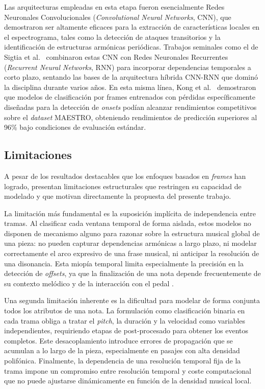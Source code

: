 Las arquitecturas empleadas en esta etapa fueron esencialmente Redes Neuronales
Convolucionales (\textit{Convolutional Neural Networks}, CNN), que demostraron ser
altamente eficaces para la extracción de características locales en el espectrograma, tales como la detección de ataques transitorios y la identificación de estructuras armónicas periódicas. Trabajos seminales como el de Sigtia et al.\ \cite{sigtia2016end} combinaron estas CNN con Redes Neuronales Recurrentes (\textit{Recurrent Neural Networks}, RNN) para incorporar dependencias temporales a corto plazo, sentando las bases de la arquitectura híbrida CNN-RNN que dominó la disciplina durante varios años.
En esta misma línea, Kong et al.\ \cite{kong2021high} demostraron que modelos de
clasificación por frames entrenados con pérdidas específicamente diseñadas para la
detección de \textit{onsets} podían alcanzar rendimientos competitivos sobre el
\textit{dataset} MAESTRO, obteniendo rendimientos de predicción superiores al 96\% bajo
condiciones de evaluación estándar.
 
\subsection{Limitaciones}
 
A pesar de los resultados destacables que los enfoques basados en \textit{frames} han
logrado, presentan limitaciones estructurales que restringen su capacidad de modelado y
que motivan directamente la propuesta del presente trabajo.
 
La limitación más fundamental es la suposición implícita de independencia entre tramas.
Al clasificar cada ventana temporal de forma aislada, estos modelos no disponen de
mecanismo alguno para razonar sobre la estructura musical global de una pieza: no pueden
capturar dependencias armónicas a largo plazo, ni modelar correctamente el arco expresivo
de una frase musical, ni anticipar la resolución de una disonancia. Esta miopía temporal
limita especialmente la precisión en la detección de \textit{offsets}, ya que la finalización
de una nota depende frecuentemente de su contexto melódico y de la interacción con el
pedal \cite{benetos2019automatic}.
 
Una segunda limitación inherente es la dificultad para modelar de forma conjunta todos
los atributos de una nota. La formulación como clasificación binaria en cada trama obliga
a tratar el \textit{pitch}, la duración y la velocidad como variables independientes,
requiriendo etapas de post-procesado para obtener los eventos completos. Este
desacoplamiento introduce errores de propagación que se acumulan a lo largo de la pieza,
especialmente en pasajes con alta densidad polifónica. Finalmente, la dependencia de una
resolución temporal fija de la trama impone un compromiso entre resolución temporal y
coste computacional que no puede ajustarse dinámicamente en función de la densidad
musical local.
 
